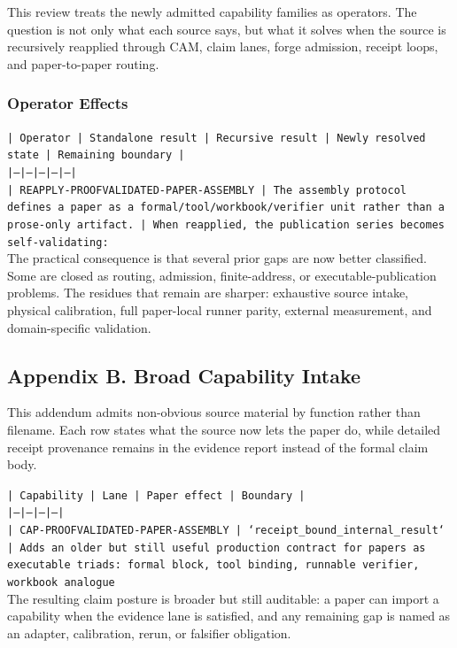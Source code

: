 \documentclass[11pt]{article}
\begin{document}
This review treats the newly admitted capability families as operators. The question is not only what each source says, but what it solves when the source is recursively reapplied through CAM, claim lanes, forge admission, receipt loops, and paper-to-paper routing.

\subsubsection*{Operator Effects}

\noindent\texttt{| Operator | Standalone result | Recursive result | Newly resolved state | Remaining boundary |}\\
\noindent\texttt{|---|---|---|---|---|}\\
\noindent\texttt{| REAPPLY-PROOFVALIDATED-PAPER-ASSEMBLY | The assembly protocol defines a paper as a formal/tool/workbook/verifier unit rather than a prose-only artifact. | When reapplied, the publication series becomes self-validating:}\\

The practical consequence is that several prior gaps are now better classified. Some are closed as routing, admission, finite-address, or executable-publication problems. The residues that remain are sharper: exhaustive source intake, physical calibration, full paper-local runner parity, external measurement, and domain-specific validation.

\subsection*{Appendix B. Broad Capability Intake}

This addendum admits non-obvious source material by function rather than filename. Each row states what the source now lets the paper do, while detailed receipt provenance remains in the evidence report instead of the formal claim body.

\noindent\texttt{| Capability | Lane | Paper effect | Boundary |}\\
\noindent\texttt{|---|---|---|---|}\\
\noindent\texttt{| CAP-PROOFVALIDATED-PAPER-ASSEMBLY | `receipt\_bound\_internal\_result` | Adds an older but still useful production contract for papers as executable triads: formal block, tool binding, runnable verifier, workbook analogue}\\

The resulting claim posture is broader but still auditable: a paper can import a capability when the evidence lane is satisfied, and any remaining gap is named as an adapter, calibration, rerun, or falsifier obligation.
\end{document}
